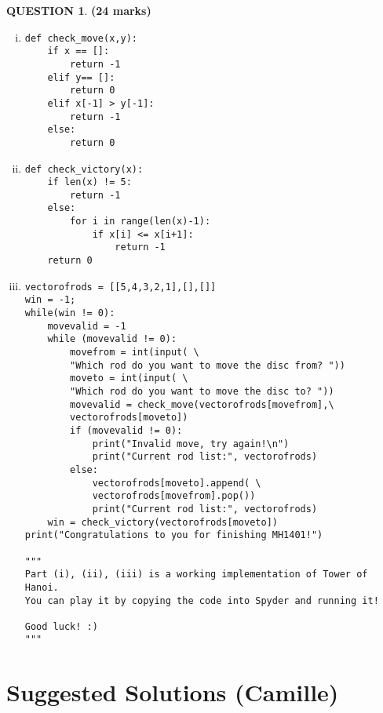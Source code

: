 \documentclass[a4paper,12pt]{article}
\theoremstyle{definition}
\newtheorem{ques}[dummy]{QUESTION}
\theoremstyle{plain}
\newcommand{\py}{python}
\begin{document}
\begin{ques}\hfill \textbf{(24 marks)}
	\begin{enumerate}[(i)]
\item
\begin{verbatim}
def check_move(x,y):
    if x == []:
        return -1
    elif y== []:
        return 0
    elif x[-1] > y[-1]:
        return -1
    else:
        return 0
\end{verbatim}
\item 
\begin{verbatim}
def check_victory(x):
    if len(x) != 5:
        return -1
    else:
        for i in range(len(x)-1):
            if x[i] <= x[i+1]:
                return -1
    return 0
\end{verbatim}
\newpage
\item 
\begin{verbatim} 
vectorofrods = [[5,4,3,2,1],[],[]]
win = -1;
while(win != 0):
    movevalid = -1
    while (movevalid != 0):
        movefrom = int(input( \
        "Which rod do you want to move the disc from? "))
        moveto = int(input( \
        "Which rod do you want to move the disc to? "))
        movevalid = check_move(vectorofrods[movefrom],\
        vectorofrods[moveto])
        if (movevalid != 0):
            print("Invalid move, try again!\n")
            print("Current rod list:", vectorofrods)
        else:
            vectorofrods[moveto].append( \
            vectorofrods[movefrom].pop())
            print("Current rod list:", vectorofrods)
    win = check_victory(vectorofrods[moveto])
print("Congratulations to you for finishing MH1401!")

"""
Part (i), (ii), (iii) is a working implementation of Tower of Hanoi.
You can play it by copying the code into Spyder and running it!

Good luck! :)
"""
\end{verbatim}
	\end{enumerate}
\end{ques}

	\newpage
	\section*{Suggested Solutions (Camille)}
\end{document}
